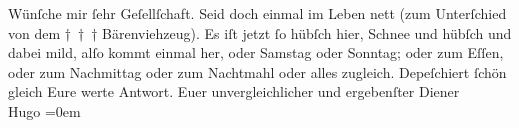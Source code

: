 \begin{ledgroupsized}[t]{13cm}
               Wünſche mir ſehr Geſellſchaft. Seid doch einmal im Leben nett (zum Unterſchied von
               dem † † † Bärenviehzeug). Es iſt jetzt ſo hübſch hier, Schnee und hübſch und dabei mild,
               alſo {\pb}kommt einmal her, oder Samstag oder Sonntag; oder zum Eſſen, oder
               zum Nachmittag oder zum Nachtmahl oder alles zugleich.\pend
           \pstart
           Depeſchiert ſchön gleich Eure werte Antwort.\pend
           \pstart
           Euer unvergleichlicher und ergebenſter Diener{\\[\baselineskip]}\spacefill\mbox{Hugo}\pend
           \leftskip=0em{}\endnumbering{}\end{ledgroupsized}  \newcommand{\dateiname}{L01655}\newcommand{\titel}{Hugo von Hofmannsthal an Arthur Schnitzler, [zwischen 3.–7. 2. 1907]}\newcommand{\editorInnen}{Martin Anton Müller und Gerd-Hermann Susen}
            \footnotesize
\begin{ledgroupsized}[t]{11.5cm}
\end{ledgroupsized}
         
      